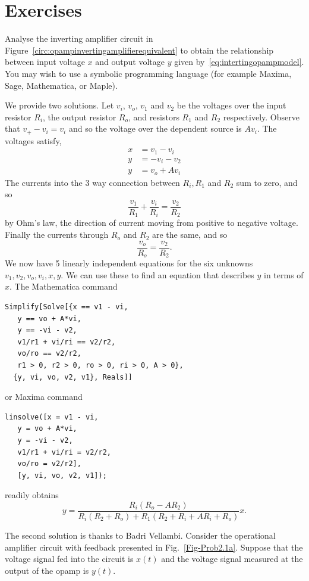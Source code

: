 
\section*{Exercises}

\begin{excersizelist}

\item \label{exer:multiplieropampwithmodel}  Analyse the inverting amplifier circuit in Figure~\ref{circ:opampinvertingamplifierequivalent} to obtain the relationship between input voltage $x$ and output voltage $y$ given by~\eqref{eq:intertingopampmodel}.  You may wish to use a symbolic programming language (for example Maxima, Sage, Mathematica, or Maple).
\begin{solution}
We provide two solutions.  Let $v_i$, $v_o$, $v_1$ and $v_2$ be the voltages over the input resistor $R_i$, the output resistor $R_o$, and resistors $R_1$ and $R_2$ respectively.  Observe that $v_+ - v_i = v_i$ and so the voltage over the dependent source is $A v_i$.  The voltages satisfy,
\begin{align*}
x &= v_1 - v_i \\
y &= -v_i - v_2 \\
y &=  v_o + Av_i
\end{align*}
The currents into the 3 way connection between $R_i, R_1$ and $R_2$ sum to zero, and so
\[
\frac{v_1}{R_1} + \frac{v_i}{R_i} = \frac{v_2}{R_2}
\]
by Ohm's law, the direction of current moving from positive to negative voltage.  Finally the currents through $R_o$ and $R_2$ are the same, and so
\[
\frac{v_o}{R_o} = \frac{v_2}{R_2}.
\]
We now have 5 linearly independent equations for the six unknowns $v_1, v_2, v_o, v_i, x, y$.  We can use these to find an equation that describes $y$ in terms of $x$.  The Mathematica command
\begin{verbatim}
Simplify[Solve[{x == v1 - vi,
   y == vo + A*vi,
   y == -vi - v2,
   v1/r1 + vi/ri == v2/r2,
   vo/ro == v2/r2,
   r1 > 0, r2 > 0, ro > 0, ri > 0, A > 0},
  {y, vi, vo, v2, v1}, Reals]]
\end{verbatim}
or Maxima command
\begin{verbatim}
linsolve([x = v1 - vi,
   y = vo + A*vi,
   y = -vi - v2,
   v1/r1 + vi/ri = v2/r2,
   vo/ro = v2/r2],
   [y, vi, vo, v2, v1]);
\end{verbatim}
readily obtains
\[
y = \frac{R_i (R_o - A R_2) }{R_i (R_2+R_o)+R_1 (R_2+R_i + A R_i+R_o)}x.
\]

The second solution is thanks to Badri Vellambi.  Consider the operational amplifier circuit with feedback presented in Fig.~\ref{Fig-Prob2.1a}. Suppose that the voltage signal fed into the circuit is $x(t)$ and the voltage signal measured at the output of the opamp is $y(t)$. 


\end{solution}
\end{excersizelist}
